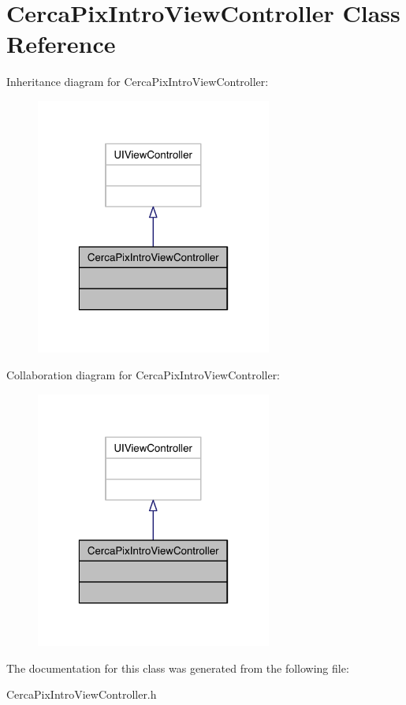 \hypertarget{interface_cerca_pix_intro_view_controller}{\section{Cerca\-Pix\-Intro\-View\-Controller Class Reference}
\label{interface_cerca_pix_intro_view_controller}
}


Inheritance diagram for Cerca\-Pix\-Intro\-View\-Controller\-:\nopagebreak
\begin{figure}[H]
\begin{center}
\leavevmode
\includegraphics[width=220pt]{interface_cerca_pix_intro_view_controller__inherit__graph}
\end{center}
\end{figure}


Collaboration diagram for Cerca\-Pix\-Intro\-View\-Controller\-:\nopagebreak
\begin{figure}[H]
\begin{center}
\leavevmode
\includegraphics[width=220pt]{interface_cerca_pix_intro_view_controller__coll__graph}
\end{center}
\end{figure}


The documentation for this class was generated from the following file\-:\begin{DoxyCompactItemize}
\item 
Cerca\-Pix\-Intro\-View\-Controller.\-h\end{DoxyCompactItemize}
